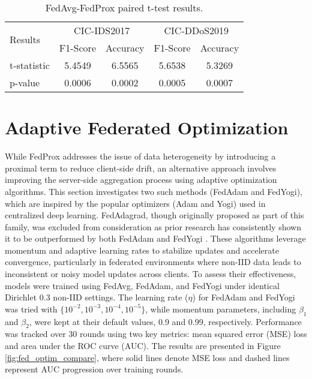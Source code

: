 \begin{table}[h]
    \caption{FedAvg-FedProx paired t-test results.}
    \centering
    \begin{tabular}{l|c|c|c|c}
        \multirow{2}{*}{Results} & \multicolumn{2}{|c|}{CIC-IDS2017} & \multicolumn{2}{|c}{CIC-DDoS2019} \\
        \cline{2-5} & F1-Score & Accuracy & F1-Score & Accuracy \\
        \hline\hline
        t-statistic & 5.4549 & 6.5565 & 5.6538 & 5.3269 \\
        p-value & 0.0006 & 0.0002 & 0.0005 & 0.0007 \\
    \end{tabular}
    \label{tbl:fedavg_fedprox_compare}
\end{table}

\section{Adaptive Federated Optimization}

While FedProx addresses the issue of data heterogeneity by introducing a proximal term to reduce client-side drift, an alternative approach involves improving the server-side aggregation process using adaptive optimization algorithms. This section investigates two such methods (FedAdam and FedYogi), which are inspired by the popular optimizers (Adam and Yogi) used in centralized deep learning. FedAdagrad, though originally proposed as part of this family, was excluded from consideration as prior research has consistently shown it to be outperformed by both FedAdam and FedYogi \citep{fedoptim}. These algorithms leverage momentum and adaptive learning rates to stabilize updates and accelerate convergence, particularly in federated environments where non-IID data leads to inconsistent or noisy model updates across clients. To assess their effectiveness, models were trained using FedAvg, FedAdam, and FedYogi under identical Dirichlet 0.3 non-IID settings. The learning rate ($\eta$) for FedAdam and FedYogi was tried with $\{10^{-2}, 10^{-3}, 10^{-4}, 10^{-5}\}$, while momentum parameters, including $\beta_1$ and $\beta_2$, were kept at their default values, 0.9 and 0.99, respectively. Performance was tracked over 30 rounds using two key metrics: mean squared error (MSE) loss and area under the ROC curve (AUC). The results are presented in Figure \ref{fig:fed_optim_compare}, where solid lines denote MSE loss and dashed lines represent AUC progression over training rounds.

